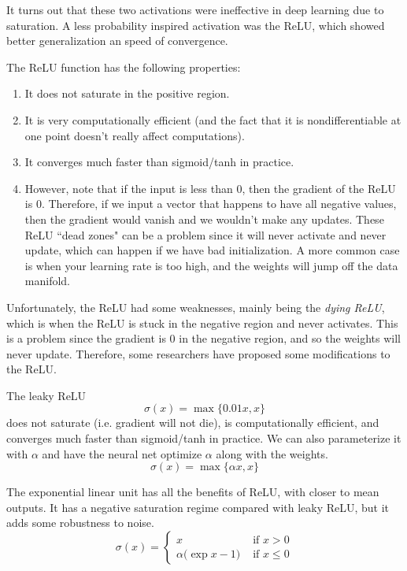 \documentclass{article}
\begin{document}
    It turns out that these two activations were ineffective in deep learning due to saturation. A less probability inspired activation was the ReLU, which showed better generalization an speed of convergence. 

    \begin{definition}
      The ReLU function has the following properties: 
      \begin{enumerate}
          \item It does not saturate in the positive region. 
          \item It is very computationally efficient (and the fact that it is nondifferentiable at one point doesn't really affect computations). 
          \item It converges much faster than sigmoid/tanh in practice. 
          \item However, note that if the input is less than $0$, then the gradient of the ReLU is $0$. Therefore, if we input a vector that happens to have all negative values, then the gradient would vanish and we wouldn't make any updates. These ReLU ``dead zones" can be a problem since it will never activate and never update, which can happen if we have bad initialization. A more common case is when your learning rate is too high, and the weights will jump off the data manifold. 
      \end{enumerate}
    \end{definition}

    Unfortunately, the ReLU had some weaknesses, mainly being the \textit{dying ReLU}, which is when the ReLU is stuck in the negative region and never activates. This is a problem since the gradient is $0$ in the negative region, and so the weights will never update. Therefore, some researchers have proposed some modifications to the ReLU. 

    \begin{definition}
      The leaky ReLU 
      \[\sigma(x) = \max\{0.01 x, x\}\]
      does not saturate (i.e. gradient will not die), is computationally efficient, and converges much faster than sigmoid/tanh in practice. We can also parameterize it with $\alpha$ and have the neural net optimize $\alpha$ along with the weights. 
      \[\sigma(x) = \max\{\alpha x, x\}\]
    \end{definition}

    \begin{definition}[ELU]
      The exponential linear unit has all the benefits of ReLU, with closer to mean outputs. It has a negative saturation regime compared with leaky ReLU, but it adds some robustness to noise. 
        \[\sigma(x) = \begin{cases} x & \text{ if } x > 0 \\ \alpha \big(\exp{x} - 1 \big) & \text{ if } x \leq 0 \end{cases}\]
    \end{definition}
\end{document}
